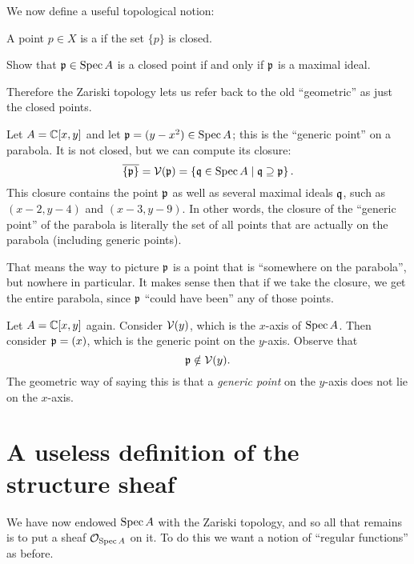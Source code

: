 We now define a useful topological notion:
\begin{definition}
	A point $p \in X$ is a  if the set $\{p\}$ is closed.
\end{definition}
\begin{ques}
	[Important]
	Show that $\mathfrak p \in \operatorname{Spec} A$ is a closed point
	if and only if $\mathfrak p$ is a maximal ideal.
\end{ques}
Therefore the Zariski topology lets us refer back to the old ``geometric''
as just the closed points.
\begin{example}
	Let $A = \mathbb C[x,y]$ and let $\mathfrak p = (y-x^2) \in \operatorname{Spec} A$;
	this is the ``generic point'' on a parabola.
	It is not closed, but we can compute its closure:
	\[
		\overline{\{\mathfrak p\}}
		= \mathcal V(\mathfrak p) = \left\{ \mathfrak q \in \operatorname{Spec} A \mid \mathfrak q \supseteq \mathfrak p \right\}.
	\]
	This closure contains the point $\mathfrak p$ as well
	as several maximal ideals $\mathfrak q$, such as $(x-2,y-4)$ and $(x-3,y-9)$.
	In other words, the closure of the ``generic point'' of the parabola
	is literally the set of all points that are actually on the parabola
	(including generic points).

	That means the way to picture $\mathfrak p$ is a point that 
	is ``somewhere on the parabola'', but nowhere in particular.
	It makes sense then that if we take the closure,
	we get the entire parabola,
	since $\mathfrak p$ ``could have been'' any of those points.
\end{example}

\begin{example}
	Let $A = \mathbb C[x,y]$ again.
	Consider $\mathcal V(y)$, which is the $x$-axis of $\operatorname{Spec} A$.
	Then consider $\mathfrak p = (x)$, which is the generic point on the $y$-axis.
	Observe that
	\[ \mathfrak p \notin \mathcal V(y). \]
	The geometric way of saying this is that a \emph{generic point}
	on the $y$-axis does not lie on the $x$-axis.
\end{example}

\section{A useless definition of the structure sheaf}

We have now endowed $\operatorname{Spec} A$ with the Zariski topology,
and so all that remains is to put a sheaf $\mathcal O_{\operatorname{Spec} A}$ on it.
To do this we want a notion of ``regular functions'' as before.

